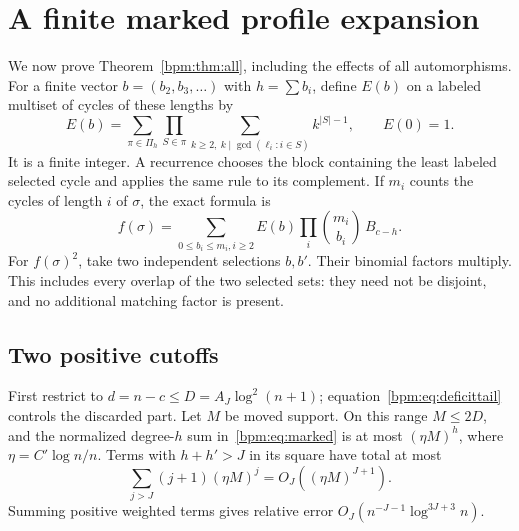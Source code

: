 \documentclass[11pt,a4paper]{article}
\theoremstyle{remark}\newtheorem{remark}[theorem]{Remark}%
\begin{document}
\section{A finite marked profile expansion}\label{bpm:sec:profiles}
We now prove Theorem~\ref{bpm:thm:all}, including the effects of all automorphisms.
For a finite vector $b=(b_2,b_3,\ldots)$ with $h=\sum b_i$, define $E(b)$ on a labeled multiset of cycles of these lengths by
\begin{equation}\label{bpm:eq:E}
 E(b)=\sum_{\pi\in\Pi_h}\prod_{S\in\pi}
       \sum_{k\ge2,\ k\mid\gcd(\ell_i:i\in S)}k^{|S|-1},
 \qquad E(0)=1.
\end{equation}
It is a finite integer. A recurrence chooses the block containing the least labeled selected cycle and applies the same rule to its complement. If $m_i$ counts the cycles of length $i$ of $\sigma$, the exact formula is
\begin{equation}\label{bpm:eq:marked}
 f(\sigma)=\sum_{0\le b_i\le m_i, i\ge2}
 E(b)\prod_i\binom{m_i}{b_i}\,B_{c-h}.
\end{equation}
For $f(\sigma)^2$, take two independent selections $b,b'$. Their binomial factors multiply. This includes every overlap of the two selected sets: they need not be disjoint, and no additional matching factor is present.

\subsection*{Two positive cutoffs}
First restrict to $d=n-c\le D=A_J\log^2(n+1)$; equation~\eqref{bpm:eq:deficittail} controls the discarded part. Let $M$ be moved support. On this range $M\le2D$, and the normalized degree-$h$ sum in~\eqref{bpm:eq:marked} is at most $(\eta M)^h$, where $\eta=C'\log n/n$. Terms with $h+h'>J$ in its square have total at most
\[
 \sum_{j>J}(j+1)(\eta M)^j=O_J((\eta M)^{J+1}).
\]
Summing positive weighted terms gives relative error
$O_J(n^{-J-1}\log^{3J+3}n)$.
\end{document}
